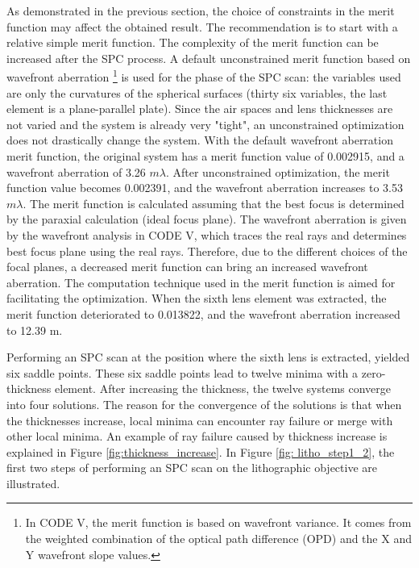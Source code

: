 As demonstrated in the previous section, the choice of constraints in the merit function may affect the obtained result. The recommendation is to start with a relative simple merit function. The complexity of the merit function can be increased after the SPC process. A default unconstrained merit function based on wavefront aberration \footnote{In CODE V, the merit function is based on wavefront variance. It comes from the weighted combination of the optical path difference (OPD) and the X and Y wavefront slope values.} is used for the phase of the SPC scan: the variables used are only the curvatures of the spherical surfaces (thirty six variables, the last element is a plane-parallel plate). Since the air spaces and lens thicknesses are not varied and the system is already very "tight", an unconstrained optimization does not drastically change the system. With the default wavefront aberration merit function, the original system has a merit function value of 0.002915, and a wavefront aberration of 3.26 $m\lambda$. After unconstrained optimization, the merit function value becomes 0.002391, and the wavefront aberration increases to 3.53 $m\lambda$. The merit function is calculated assuming that the best focus is determined by the paraxial calculation (ideal focus plane). The wavefront aberration is given by the wavefront analysis in CODE V, which traces the real rays and determines best focus plane using the real rays. Therefore, due to the different choices of the focal planes, a decreased merit function can bring an increased wavefront aberration. The computation technique used in the merit function is aimed for facilitating the optimization. When the sixth lens element was extracted, the merit function deteriorated to 0.013822, and the wavefront aberration increased to 12.39 m\textlambda.

Performing an SPC scan at the position where the sixth lens is extracted, yielded six saddle points. These six saddle points lead to twelve minima with a zero-thickness element. After increasing the thickness, the twelve systems converge into four solutions. The reason for the convergence of the solutions is that when the thicknesses increase, local minima can encounter ray failure or merge with other local minima. An example of ray failure caused by thickness increase is explained in Figure \ref{fig:thickness_increase}. In Figure \ref{fig: litho_step1_2}, the first two steps of performing an SPC scan on the lithographic objective are illustrated.

